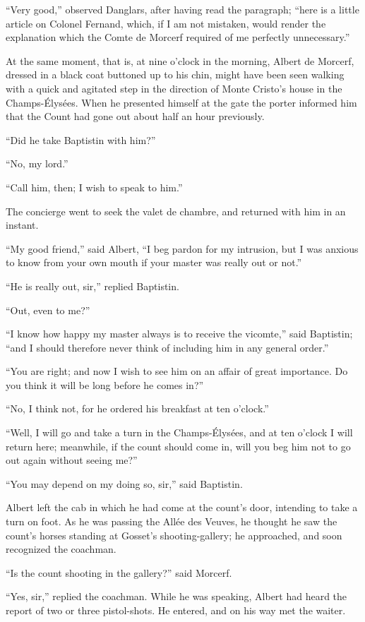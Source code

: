 “Very good,” observed Danglars, after having read the paragraph; “here
is a little article on Colonel Fernand, which, if I am not mistaken,
would render the explanation which the Comte de Morcerf required of me
perfectly unnecessary.”

At the same moment, that is, at nine o’clock in the morning, Albert de
Morcerf, dressed in a black coat buttoned up to his chin, might have
been seen walking with a quick and agitated step in the direction of
Monte Cristo’s house in the Champs-Élysées. When he presented himself
at the gate the porter informed him that the Count had gone out about
half an hour previously.

“Did he take Baptistin with him?”

“No, my lord.”

“Call him, then; I wish to speak to him.”

The concierge went to seek the valet de chambre, and returned with him
in an instant.

“My good friend,” said Albert, “I beg pardon for my intrusion, but I
was anxious to know from your own mouth if your master was really out
or not.”

“He is really out, sir,” replied Baptistin.

“Out, even to me?”

“I know how happy my master always is to receive the vicomte,” said
Baptistin; “and I should therefore never think of including him in any
general order.”

“You are right; and now I wish to see him on an affair of great
importance. Do you think it will be long before he comes in?”

“No, I think not, for he ordered his breakfast at ten o’clock.”

“Well, I will go and take a turn in the Champs-Élysées, and at ten
o’clock I will return here; meanwhile, if the count should come in,
will you beg him not to go out again without seeing me?”

“You may depend on my doing so, sir,” said Baptistin.

Albert left the cab in which he had come at the count’s door, intending
to take a turn on foot. As he was passing the Allée des Veuves, he
thought he saw the count’s horses standing at Gosset’s
shooting-gallery; he approached, and soon recognized the coachman.

“Is the count shooting in the gallery?” said Morcerf.

“Yes, sir,” replied the coachman. While he was speaking, Albert had
heard the report of two or three pistol-shots. He entered, and on his
way met the waiter.

